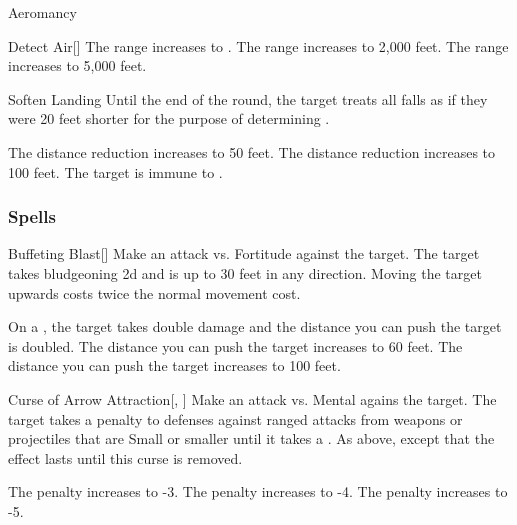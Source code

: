 \begin{spellsection}{Aeromancy}
\begin{freeability}{Detect Air}[]
\rankline
{} The range increases to \rngext.
 The range increases to 2,000 feet.
 The range increases to 5,000 feet.
\end{freeability}


\begin{freeability}{Soften Landing}
Until the end of the round, the target treats all falls as if they were 20 feet shorter for the purpose of determining .

\rankline
{} The distance reduction increases to 50 feet.
 The distance reduction increases to 100 feet.
 The target is immune to .
\end{freeability}

\end{spellsection}


\subsubsection{Spells}


\lowercase{\hypertarget{spell:Buffeting Blast}{}}\label{spell:Buffeting Blast}
\begin{freeability}[Rank 1]{\hypertarget{spell:Buffeting Blast}{Buffeting Blast}}[]
Make an attack vs. Fortitude against the target.
\hit The target takes bludgeoning  \minus2d and is  up to 30 feet in any direction.
Moving the target upwards costs twice the normal movement cost.

\rankline
{} On a , the target takes double damage and the distance you can push the target is doubled.
 The distance you can push the target increases to 60 feet.
 The distance you can push the target increases to 100 feet.

\end{freeability}
\vspace{0.25em}



\lowercase{\hypertarget{spell:Curse of Arrow Attraction}{}}\label{spell:Curse of Arrow Attraction}
\begin{freeability}[Rank 1]{\hypertarget{spell:Curse of Arrow Attraction}{Curse of Arrow Attraction}}[, ]
Make an attack vs. Mental agains the target.
\hit The target takes a  penalty to defenses against  ranged attacks from weapons or projectiles that are Small or smaller until it takes a .
\crit As above, except that the effect lasts until this curse is removed.

\rankline
{} The penalty increases to -3.
 The penalty increases to -4.
 The penalty increases to -5.

\end{freeability}
\vspace{0.25em}



